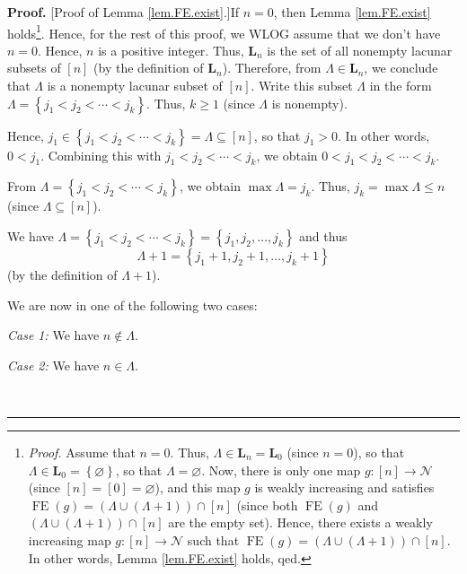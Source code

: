 \documentclass[numbers=enddot,12pt,final,onecolumn,notitlepage]{scrartcl}%
\theoremstyle{definition}
\newenvironment{proof}[1][Proof]{\noindent\textbf{#1.} }{\ \rule{0.5em}{0.5em}}
\newenvironment{verlong}{}{}
\begin{document}
\begin{verlong}
\begin{proof}
[Proof of Lemma \ref{lem.FE.exist}.]If $n=0$, then Lemma \ref{lem.FE.exist}
holds\footnote{\textit{Proof.} Assume that $n=0$. Thus, $\Lambda\in
\mathbf{L}_{n}=\mathbf{L}_{0}$ (since $n=0$), so that $\Lambda\in
\mathbf{L}_{0}=\left\{  \varnothing\right\}  $, so that $\Lambda=\varnothing$.
Now, there is only one map $g:\left[  n\right]  \rightarrow\mathcal{N}$ (since
$\left[  n\right]  =\left[  0\right]  =\varnothing$), and this map $g$ is
weakly increasing and satisfies $\operatorname*{FE}\left(  g\right)  =\left(
\Lambda\cup\left(  \Lambda+1\right)  \right)  \cap\left[  n\right]  $ (since
both $\operatorname*{FE}\left(  g\right)  $ and $\left(  \Lambda\cup\left(
\Lambda+1\right)  \right)  \cap\left[  n\right]  $ are the empty set). Hence,
there exists a weakly increasing map $g:\left[  n\right]  \rightarrow
\mathcal{N}$ such that $\operatorname*{FE}\left(  g\right)  =\left(
\Lambda\cup\left(  \Lambda+1\right)  \right)  \cap\left[  n\right]  $. In
other words, Lemma \ref{lem.FE.exist} holds, qed.}. Hence, for the rest of
this proof, we WLOG assume that we don't have $n=0$. Hence, $n$ is a positive
integer. Thus, $\mathbf{L}_{n}$ is the set of all nonempty lacunar subsets of
$\left[  n\right]  $ (by the definition of $\mathbf{L}_{n}$). Therefore, from
$\Lambda\in\mathbf{L}_{n}$, we conclude that $\Lambda$ is a nonempty lacunar
subset of $\left[  n\right]  $. Write this subset $\Lambda$ in the form
$\Lambda=\left\{  j_{1}<j_{2}<\cdots<j_{k}\right\}  $. Thus, $k\geq1$ (since
$\Lambda$ is nonempty).

Hence, $j_{1}\in\left\{  j_{1}<j_{2}<\cdots<j_{k}\right\}  =\Lambda
\subseteq\left[  n\right]  $, so that $j_{1}>0$. In other words, $0<j_{1}$.
Combining this with $j_{1}<j_{2}<\cdots<j_{k}$, we obtain $0<j_{1}%
<j_{2}<\cdots<j_{k}$.

From $\Lambda=\left\{  j_{1}<j_{2}<\cdots<j_{k}\right\}  $, we obtain
$\max\Lambda=j_{k}$. Thus, $j_{k}=\max\Lambda\leq n$ (since $\Lambda
\subseteq\left[  n\right]  $).

We have $\Lambda=\left\{  j_{1}<j_{2}<\cdots<j_{k}\right\}  =\left\{
j_{1},j_{2},\ldots,j_{k}\right\}  $ and thus%
\[
\Lambda+1=\left\{  j_{1}+1,j_{2}+1,\ldots,j_{k}+1\right\}
\]
(by the definition of $\Lambda+1$).

We are now in one of the following two cases:

\textit{Case 1:} We have $n\notin\Lambda$.

\textit{Case 2:} We have $n\in\Lambda$.


\end{proof}
\end{verlong}
\end{document}

